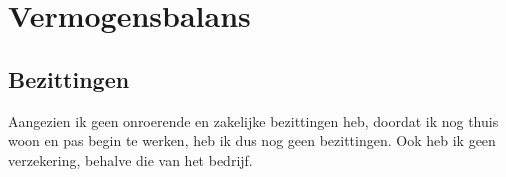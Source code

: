 \newpage
\section{Vermogensbalans}

\subsection{Bezittingen}

%

Aangezien ik geen onroerende en zakelijke bezittingen heb, doordat ik nog thuis woon en pas begin te werken, heb ik dus nog geen bezittingen. Ook heb ik geen verzekering, behalve die van het bedrijf.

